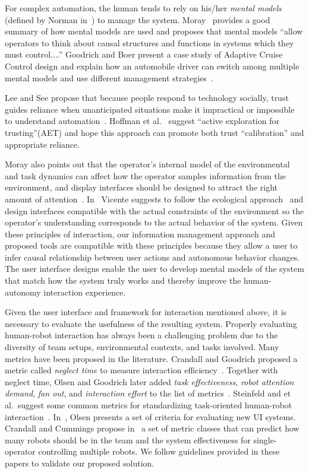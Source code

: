 For complex automation, the human tends to rely on his/her \textit{mental models} (defined by Norman in~\cite{Norman1983Some}) to manage the system. Moray~\cite{Moray1999Mental} provides a good summary of how mental models are used and proposes that mental models ``allow operators to think about causal structures and functions in systems which they must control....'' Goodrich and Boer present a case study of Adaptive Cruise Control design and explain how an automobile driver can switch among multiple mental models and use different management strategies~\cite{Goodrich2002Multiple, Goodrich2003Model}. 

Lee and See propose that because people respond to technology socially, trust guides reliance when unanticipated situations make it impractical or impossible to understand automation~\cite{Lee2004Trust}. Hoffman et al.\ \cite{Hoffman2013Trust} suggest ``active exploration for trusting''(AET) and hope this approach can promote both trust ``calibration'' and appropriate reliance. 

Moray also points out that the operator's internal model of the environmental and task dynamics can affect how the operator samples information from the environment, and display interfaces should be designed to attract the right amount of attention~\cite{Moray1990Designing}. In~\cite{Vicente1997Should} Vicente suggests to follow the ecological approach~\cite{Rasmussen1994Cognitive} and design interfaces compatible with the actual constraints of the environment so the operator's understanding corresponds to the actual behavior of the system. Given these principles of interaction, our information management approach and proposed tools are compatible with these principles because they allow a user to infer causal relationship between user actions and autonomous behavior changes. The user interface designs enable the user to develop mental models of the system that match how the system truly works and thereby improve the human-autonomy interaction experience.

Given the user interface and framework for interaction mentioned above, it is necessary to evaluate the usefulness of the resulting system. Properly evaluating human-robot interaction has always been a challenging problem due to the diversity of team setups, environmental contexts, and tasks involved. Many metrics have been proposed in the literature. Crandall and Goodrich proposed a metric called \textit{neglect time} to measure interaction efficiency~\cite{Crandall2002Principles}. Together with neglect time, Olsen and Goodrich later added \textit{task effectiveness}, \textit{robot attention demand}, \textit{fan out}, and \textit{interaction effort} to the list of metrics~\cite{Olsen2003Metrics}. Steinfeld and et al.\ suggest some common metrics for standardizing task-oriented human-robot interaction~\cite{Steinfeld2006Common}. In~\cite{Olsen2007Evaluating}, Olsen presents a set of criteria for evaluating new UI systems. Crandall and Cummings propose in~\cite{Crandall2007Ddentifying} a set of metric classes that can predict how many robots should be in the team and the system effectiveness for single-operator controlling multiple robots. We follow guidelines provided in these papers to validate our proposed solution.

